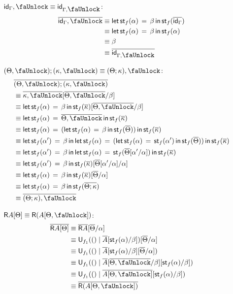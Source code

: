 \documentclass[10pt]{article}
\theoremstyle{definition}
\newcommand{\id}{\mathsf{id}}
\newcommand\U[3]{\ensuremath{\mathsf{U}_{#1}(#2 \mid #3)}}
\newcommand\StI[2]{\ensuremath{\mathsf{st}_{#1}(#2)}}
\newcommand\StE[4]{\ensuremath{\mathsf{let} \, \StI{#1}{#3} \, = \, {#2} \, \mathsf{in} \, #4}}
\begin{document}
\begin{enumerate}[style = multiline, labelwidth = 80pt]
\item[{$\id_\Gamma , \lock \equiv \id_{\Gamma, \lock}$}:] 
\begin{align*}
\upstairs{\id_\Gamma , \lock} 
&\equiv \StE{f}{\beta}{\alpha}{\StI{f}{\upstairs{\id_\Gamma}}} \\ 
&\equiv \StE{f}{\beta}{\alpha}{\StI{f}{\alpha}} \\ 
&\equiv \beta \\
&\equiv \upstairs{\id_{\Gamma , \lock}} 
\end{align*}
\item[{$(\Theta, \lock) ; (\kappa, \lock) \equiv (\Theta ; \kappa), \lock$}:] 
\begin{align*}
&\upstairs{(\Theta, \lock) ; (\kappa, \lock)} \\
&\equiv \upstairs{\kappa, \lock}[\upstairs{\Theta, \lock}/\beta] \\
&\equiv \StE{f}{\beta}{\alpha}{\StI{f}{\upstairs{\kappa}}}[\upstairs{\Theta, \lock}/\beta] \\
&\equiv \StE{f}{\upstairs{\Theta, \lock}}{\alpha}{\StI{f}{\upstairs{\kappa}}} \\
&\equiv \StE{f}{(\StE{f}{\beta}{\alpha}{\StI{f}{\upstairs{\Theta}}})}{\alpha}{\StI{f}{\upstairs{\kappa}}} \\
&\equiv \StE{f}{\beta}{\alpha'}{\StE{f}{(\StE{f}{\StI{f}{\alpha'}}{\alpha}{\StI{f}{\upstairs{\Theta}}})}{\alpha}{\StI{f}{\upstairs{\kappa}}}} \\
&\equiv \StE{f}{\beta}{\alpha'}{\StE{f}{\StI{f}{\upstairs{\Theta}[\alpha'/\alpha]}}{\alpha}{\StI{f}{\upstairs{\kappa}}}} \\
&\equiv \StE{f}{\beta}{\alpha'}{\StI{f}{\upstairs{\kappa}}[\upstairs{\Theta}[\alpha'/\alpha]/\alpha]} \\
&\equiv \StE{f}{\beta}{\alpha}{\StI{f}{\upstairs{\kappa}}[\upstairs{\Theta}/\alpha]} \\
&\equiv \StE{f}{\beta}{\alpha}{\StI{f}{\upstairs{\Theta;\kappa}}} \\
&\equiv \upstairs{(\Theta;\kappa), \lock}
\end{align*}

\item[{$\Rtype{A}[\Theta] \equiv \Rtype{(A[\Theta, \lock])}$}:] 
\begin{align*}
\upstairs{\Rtype{A}[\Theta]}
&\equiv \upstairs{\Rtype{A}}[\upstairs{\Theta}/\alpha] \\
&\equiv \U{f_1}{()}{\upstairs{A}[\StI{f}{\alpha}/\beta]}[\upstairs{\Theta}/\alpha] \\
&\equiv \U{f_1}{()}{\upstairs{A}[\StI{f}{\alpha}/\beta][\upstairs{\Theta}/\alpha]} \\
&\equiv \U{f_1}{()}{\upstairs{A}[\upstairs{\Theta, \lock}/\beta][\StI{f}{\alpha}/\beta]} \\
&\equiv \U{f_1}{()}{\upstairs{A[\Theta, \lock]}[\StI{f}{\alpha}/\beta]} \\
&\equiv \upstairs{\Rtype{(A[\Theta, \lock])}} 
\end{align*}


\end{enumerate}
\end{document}
